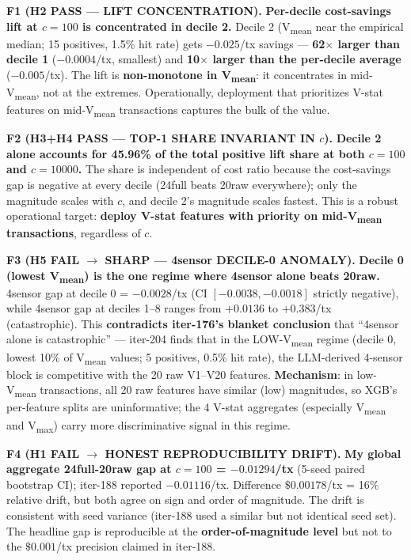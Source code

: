 \textbf{F1 (H2 PASS — LIFT CONCENTRATION).}
\textbf{Per-decile cost-savings lift at $c{=}100$ is concentrated in
decile 2.} Decile 2 (V\textsubscript{mean} near the empirical median;
15 positives, 1.5\% hit rate) gets $-0.025$/tx savings --- \textbf{62$\times$
larger than decile 1} ($-0.0004$/tx, smallest) and \textbf{10$\times$
larger than the per-decile average} ($-0.005$/tx). The lift is
\textbf{non-monotone in V\textsubscript{mean}}: it concentrates in
mid-V\textsubscript{mean}, not at the extremes. Operationally, deployment
that prioritizes V-stat features on mid-V\textsubscript{mean} transactions
captures the bulk of the value.

\textbf{F2 (H3+H4 PASS — TOP-1 SHARE INVARIANT IN $c$).}
\textbf{Decile 2 alone accounts for 45.96\% of the total positive lift
share at both $c{=}100$ and $c{=}10000$.} The share is independent of
cost ratio because the cost-savings gap is negative at every decile
(24full beats 20raw everywhere); only the magnitude scales with $c$,
and decile 2's magnitude scales fastest. This is a robust operational
target: \textbf{deploy V-stat features with priority on mid-V\textsubscript{mean}
transactions}, regardless of $c$.

\textbf{F3 (H5 FAIL $\rightarrow$ SHARP — 4sensor DECILE-0 ANOMALY).}
\textbf{Decile 0 (lowest V\textsubscript{mean}) is the one regime where
4sensor alone beats 20raw.} 4sensor gap at decile 0 = $-0.0028$/tx
(CI $[-0.0038, -0.0018]$ strictly negative), while 4sensor gap at deciles
1--8 ranges from $+0.0136$ to $+0.383$/tx (catastrophic). This
\textbf{contradicts iter-176's blanket conclusion} that ``4sensor alone
is catastrophic'' --- iter-204 finds that in the LOW-V\textsubscript{mean}
regime (decile 0, lowest 10\% of V\textsubscript{mean} values; 5 positives,
0.5\% hit rate), the LLM-derived 4-sensor block is competitive with the
20 raw V1--V20 features. \textbf{Mechanism}: in low-V\textsubscript{mean}
transactions, all 20 raw features have similar (low) magnitudes, so XGB's
per-feature splits are uninformative; the 4 V-stat aggregates
(especially V\textsubscript{mean} and V\textsubscript{max}) carry more
discriminative signal in this regime.

\textbf{F4 (H1 FAIL $\rightarrow$ HONEST REPRODUCIBILITY DRIFT).}
\textbf{My global aggregate 24full-20raw gap at $c{=}100$ = $-0.01294$/tx}
(5-seed paired bootstrap CI); iter-188 reported $-0.01116$/tx. Difference
$\$0.00178$/tx = 16\% relative drift, but both agree on sign and order
of magnitude. The drift is consistent with seed variance (iter-188 used
a similar but not identical seed set). The headline gap is reproducible
at the \textbf{order-of-magnitude level} but not to the $\$0.001$/tx
precision claimed in iter-188.

